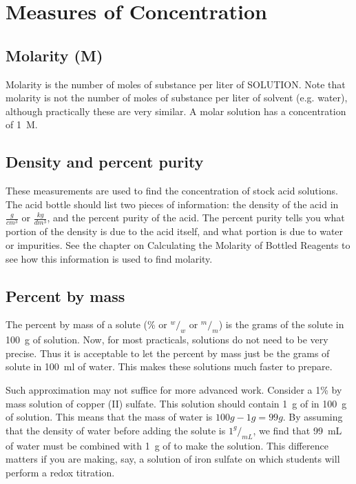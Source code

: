 \chapter{Measures of Concentration} 

\section{Molarity (M)} 

Molarity is the number of moles of substance per liter of SOLUTION. Note that molarity is not the number of moles of substance per liter of solvent (e.g. water), although practically these are very similar. A molar solution has a concentration of 1~M.

\section{Density and percent purity}

These measurements are used to find the concentration of stock acid solutions. The acid bottle should list two pieces of information: the density of the acid in $\frac{g}{cm^3}$ or $\frac{kg}{dm^3}$, and the percent purity of the acid. The percent purity tells you what portion of the density is due to the acid itself, and what portion is due to water or impurities. See the chapter on Calculating the Molarity of Bottled Reagents to see how this information is used to find molarity.

\section{Percent by mass}

The percent by mass of a solute (\% or $^w/_w$ or $^m/_m$) is the grams of the solute in 100~g of solution. Now, for most practicals, solutions do not need to be very precise. Thus it is acceptable to let the percent by mass just be the grams of solute in 100~ml of water. This makes these solutions much faster to prepare.

Such approximation may not suffice for more advanced work. Consider a 1\% by mass solution of copper (II) sulfate. This solution should contain 1~g of  in 100~g of solution. This means that the mass of water is $100 g - 1 g = 99 g$. By assuming that the density of water before adding the solute is $1 ^g/_{mL}$, we find that 99~mL of water must be combined with 1~g of  to make the solution. This difference matters if you are making, say, a solution of iron sulfate on which students will perform a redox titration. 

